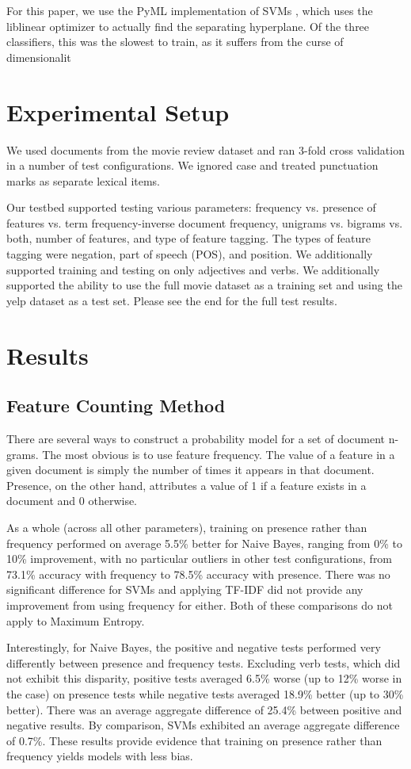 \documentclass[10pt,twocolumn,letterpaper]{article}
\begin{document}
For this paper, we use the PyML implementation of SVMs \cite{PyML}, which uses the liblinear optimizer to actually find the separating hyperplane. Of the three classifiers, this was the slowest to train, as it suffers from the curse of dimensionalit

\section{Experimental Setup}
We used documents from the movie review dataset and ran 3-fold cross validation in a number of test configurations. We ignored case and treated punctuation marks as separate lexical items. 

Our testbed supported testing various parameters: frequency vs. presence of features vs. term frequency-inverse document frequency, unigrams vs. bigrams vs. both, number of features, and type of feature tagging. The types of feature tagging were negation, part of speech (POS), and position. We additionally supported training and testing on only adjectives and verbs. We additionally supported the ability to use the full movie dataset as a training set and using the yelp dataset as a test set. Please see the end for the full test results.

\section{Results}
\subsection{Feature Counting Method}
There are several ways to construct a probability model for a set of document n-grams. The most obvious is to use feature frequency. The value of a feature in a given document is simply the number of times it appears in that document. Presence, on the other hand, attributes a value of 1 if a feature exists in a document and 0 otherwise.

As a whole (across all other parameters), training on presence rather than frequency performed on average 5.5\% better for Naive Bayes, ranging from 0\% to 10\% improvement, with no particular outliers in other test configurations, from 73.1\% accuracy with frequency to 78.5\% accuracy with presence. There was no significant difference for SVMs and applying TF-IDF did not provide any improvement from using frequency for either. Both of these comparisons do not apply to Maximum Entropy.

Interestingly, for Naive Bayes, the positive and negative tests performed very differently between presence and frequency tests. Excluding verb tests, which did not exhibit this disparity, positive tests averaged 6.5\% worse (up to 12\% worse in the case) on presence tests while negative tests averaged 18.9\% better (up to 30\% better). There was an average aggregate difference of 25.4\% between positive and negative results. By comparison, SVMs exhibited an average aggregate difference of 0.7\%. These results provide evidence that training on presence rather than frequency yields models with less bias.
\end{document}
